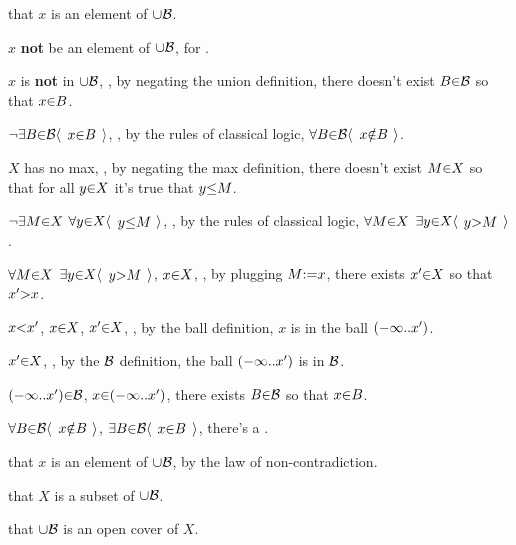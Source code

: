   \hs {} that $x$ is an element of $\p\cup{\cal B}$. \par
    \hs\hs {} $x$ {\bf not} be an element of $\p\cup{\cal B}$, for . \par
    \hs\hs {} $x$ is {\bf not} in $\p\cup{\cal B}$, , by negating the union definition, there doesn't exist $B \p\in {\cal B}$ so that $x \p\in B$. \par
    \hs\hs {} $\neg\a\exists B \p\in \cal B \a\langle$ $x \p\in B$ $\a\rangle$, , by the rules of classical logic, $\a\forall B \p\in {\cal B} \a\langle$ $x \p\notin B$ $\a\rangle$. \par

    \vs
    \hs\hs {} $X$ has no max, , by negating the max definition, there doesn't exist $M \p\in X$ so that for all $y \p\in X$ it's true that $y \p\leq M$. \par
    \hs\hs {} $\neg\a\exists M \p\in X$  $\a\forall y \p\in X \a\langle$ $y \p\leq M$ $\a\rangle$, , by the rules of classical logic, $\a\forall M \p\in X$ $\a\exists y \p\in X \a\langle$ $y \p> M$ $\a\rangle$. \par
    \hs\hs {} $\a\forall M \p\in X$ $\a\exists y \p\in X \a\langle$ $y \p> M$ $\a\rangle$,  $x \p\in X$, , by plugging $M \p{:=} x$, there exists $x' \p\in X$ so that $x' \p> x$. \par
    \hs\hs {} $x \p< x'$,  $x \p\in X$,  $x' \p\in X$, , by the ball definition, $x$ is in the ball $\a(\p-\infty \a{..} x'\a)$. \par
    \hs\hs {} $x' \p\in X$, , by the ${\cal B}$ definition, the ball $\a(\p-\infty \a{..} x'\a)$ is in ${\cal B}$. \par
    \hs\hs {} $\a(\p-\infty \a{..} x'\a) \p\in {\cal B}$,  $x \p\in \a(\p-\infty \a{..} x'\a)$,  there exists $B \p\in {\cal B}$ so that $x \p\in B$. \par

    \vs
    \hs\hs {} $\a\forall B \p\in {\cal B} \a\langle$ $x \p\notin B$ $\a\rangle$,  $\a\exists B \p\in {\cal B} \a\langle$ $x \p\in B$ $\a\rangle$,  there's a .

  \hs {} that $x$ is an element of $\p\cup{\cal B}$, by the law of non-contradiction. \par

 that $X$ is a subset of $\p\cup{\cal B}$. \par
{} that $\p\cup{\cal B}$ is an open cover of $X$. \par

